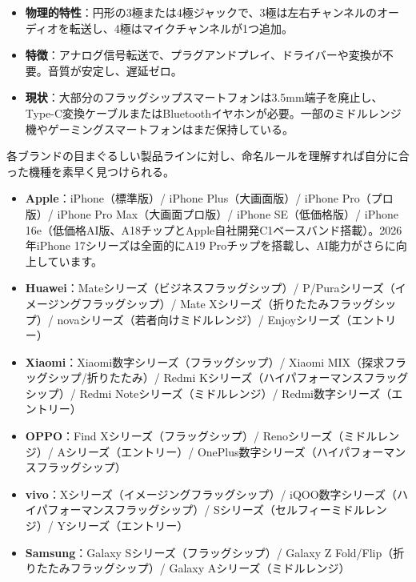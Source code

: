 
\begin{itemize}
  \item \textbf{物理的特性}：円形の3極または4極ジャックで、3極は左右チャンネルのオーディオを転送し、4極はマイクチャンネルが1つ追加。
  \item \textbf{特徴}：アナログ信号転送で、プラグアンドプレイ、ドライバーや変換が不要。音質が安定し、遅延ゼロ。
  \item \textbf{現状}：大部分のフラッグシップスマートフォンは3.5mm端子を廃止し、Type-C変換ケーブルまたはBluetoothイヤホンが必要。一部のミドルレンジ機やゲーミングスマートフォンはまだ保持している。
\end{itemize}


各ブランドの目まぐるしい製品ラインに対し、命名ルールを理解すれば自分に合った機種を素早く見つけられる。


\begin{itemize}
  \item \textbf{Apple}：iPhone（標準版）/ iPhone Plus（大画面版）/ iPhone Pro（プロ版）/ iPhone Pro Max（大画面プロ版）/ iPhone SE（低価格版）/ iPhone 16e（低価格AI版、A18チップとApple自社開発C1ベースバンド搭載）。2026年iPhone 17シリーズは全面的にA19 Proチップを搭載し、AI能力がさらに向上しています。
  \item \textbf{Huawei}：Mateシリーズ（ビジネスフラッグシップ）/ P/Puraシリーズ（イメージングフラッグシップ）/ Mate Xシリーズ（折りたたみフラッグシップ）/ novaシリーズ（若者向けミドルレンジ）/ Enjoyシリーズ（エントリー）
  \item \textbf{Xiaomi}：Xiaomi数字シリーズ（フラッグシップ）/ Xiaomi MIX（探求フラッグシップ/折りたたみ）/ Redmi Kシリーズ（ハイパフォーマンスフラッグシップ）/ Redmi Noteシリーズ（ミドルレンジ）/ Redmi数字シリーズ（エントリー）
  \item \textbf{OPPO}：Find Xシリーズ（フラッグシップ）/ Renoシリーズ（ミドルレンジ）/ Aシリーズ（エントリー）/ OnePlus数字シリーズ（ハイパフォーマンスフラッグシップ）
  \item \textbf{vivo}：Xシリーズ（イメージングフラッグシップ）/ iQOO数字シリーズ（ハイパフォーマンスフラッグシップ）/ Sシリーズ（セルフィーミドルレンジ）/ Yシリーズ（エントリー）
  \item \textbf{Samsung}：Galaxy Sシリーズ（フラッグシップ）/ Galaxy Z Fold/Flip（折りたたみフラッグシップ）/ Galaxy Aシリーズ（ミドルレンジ）
\end{itemize}

